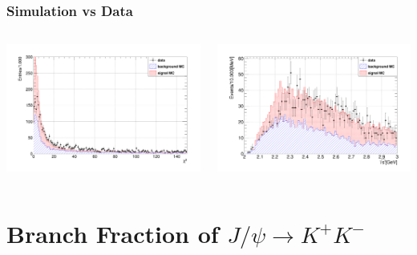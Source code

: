 \documentclass[aspectratio=169]{ctexbeamer}
\begin{document}
\begin{frame}
  \frametitle{Simulation vs Data}
  \begin{columns}
    \begin{column}{0.5\textwidth}
      \centering
      \includegraphics[width=\textwidth]{figures/data_vs_mc_chisq.png}
    \end{column}

    \begin{column}{0.5\textwidth}
      \centering
      \includegraphics[width=\textwidth]{figures/data_vs_mc_vpho.png}
    \end{column}
  \end{columns}
\end{frame}

\section{Branch Fraction of $J/\psi\to K^+ K^-$}
\end{document}
